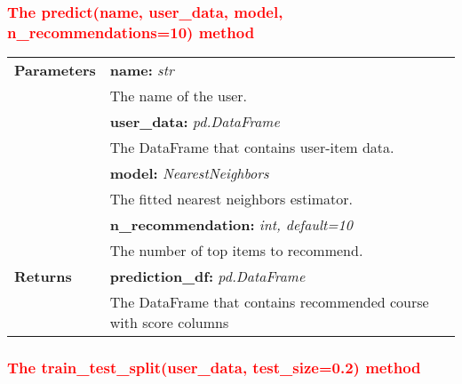 \subsubsection{\textcolor{red}{The predict(name, user\_data, model, n\_recommendations=10) method}}

\vspace{-7mm}
\begin{table}[H]
\small
\begin{tabularx}{\textwidth}{|p{2cm}|X|}
\hline
\textbf{Parameters} & \textbf{name:} \textit{str} \\ & \hspace{5mm} The name of the user. \\
& \textbf{user\_data:} \textit{pd.DataFrame} \\ & \hspace{5mm} The DataFrame that contains user-item data. \\
& \textbf{model:} \textit{NearestNeighbors} \\ & \hspace{5mm} The fitted nearest neighbors estimator. \\
& \textbf{n\_recommendation:} \textit{int, default=10} \\ & \hspace{5mm} The number of top items to recommend. \\
\textbf{Returns} & \textbf{prediction\_df:} \textit{pd.DataFrame} \\ & \hspace{5mm} The DataFrame that contains recommended course with score columns \\
\hline
\end{tabularx}
\end{table}

\subsubsection{\textcolor{red}{The train\_test\_split(user\_data, test\_size=0.2) method}}


